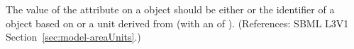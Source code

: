 The value of the attribute  on a \Model object should be
either  or the identifier of a \UnitDefinition object
based on  or a unit derived from  (with an
 of ).  (References: SBML L3V1
Section~\ref{sec:model-areaUnits}.)
